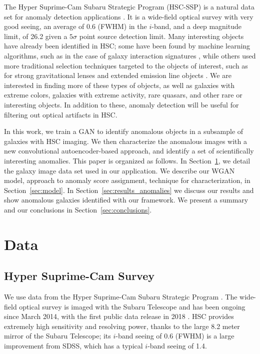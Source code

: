 The Hyper Suprime-Cam Subaru Strategic Program (HSC-SSP) is a natural data set for anomaly detection applications \citep{Miyazaki2018}.
It is a wide-field optical survey with very good seeing, an average of 0.6 (FWHM) in the $i$-band, and a deep magnitude limit, of 26.2 given a $5\sigma$ point source detection limit.
Many interesting objects have already been identified in HSC; some have been found by machine learning algorithms, such as in the case of galaxy interaction signatures \citep{Goulding2017}, while others used more traditional selection techniques targeted to the objects of interest, such as for strong gravitational lenses \citep{Wong2018} and extended emission line objects \citep{Sun2018}.
We are interested in finding more of these types of objects, as well as galaxies with extreme colors, galaxies with extreme activity, rare quasars, and other rare or interesting objects.
In addition to these, anomaly detection will be useful for filtering out optical artifacts in HSC.

In this work, we train a GAN to identify anomalous objects in a subsample of galaxies with HSC imaging.
We then characterize the anomalous images with a new convolutional autoencoder-based approach, and identify a set of scientifically interesting anomalies.
This paper is organized as follows.
In Section~\ref{sec:data_anomalies}, we detail the galaxy image data set used in our application.
We describe our WGAN model, approach to anomaly score assignment, technique for characterization,  in Section~\ref{sec:model}.
In Section~\ref{sec:results_anomalies} we discuss our results and show anomalous galaxies identified with our framework.
We present a summary and our conclusions in Section~\ref{sec:conclusions}.

\section{Data}
\label{sec:data_anomalies}

\subsection{Hyper Suprime-Cam Survey}

We use data from the Hyper Suprime-Cam Subaru Strategic Program \citep{aihara_hyper_2018}.
The wide-field optical survey is imaged with the Subaru Telescope and has been ongoing since March 2014, with the first public data release in 2018 \citep{Aihara2018b}.
HSC provides extremely high sensitivity and resolving power, thanks to the large 8.2 meter mirror of the Subaru Telescope; its $i$-band seeing of 0.6 (FWHM) is a large improvement from SDSS, which has a typical $i$-band seeing of 1.4.

